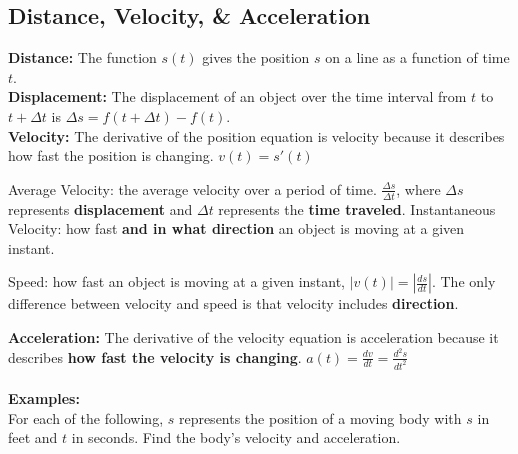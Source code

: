 \subsection*{Distance, Velocity, \& Acceleration}
\noindent\textbf{Distance:} The function $s(t)$ gives the position $s$ on a line as a function of time $t$.\\
\noindent\textbf{Displacement:} The displacement of an object over the time interval from $t$ to $t+\Delta t$ is $\Delta s=f(t+\Delta t)-f(t)$.\\
\noindent\textbf{Velocity:} The derivative of the position equation is velocity because it describes how fast the position is changing. $v(t)=s'(t)$
\begin{questions}
    \question Average Velocity: the average velocity over a period of time. $\displaystyle\frac{\Delta s}{\Delta t}$, where $\Delta s$ represents \textbf{displacement} and $\Delta t$ represents the \textbf{time traveled}.
    \vspace{.1cm}
    \question Instantaneous Velocity: how fast \textbf{and in what direction} an object is moving at a given instant.
    \question Speed: how fast an object is moving at a given instant, $\displaystyle |v(t)|=\left|\frac{ds}{dt}\right|$. The only difference between velocity and speed is that velocity includes \textbf{direction}.
\end{questions}
\noindent\textbf{Acceleration:} The derivative of the velocity equation is acceleration because it describes \textbf{how fast the velocity is changing}. $\displaystyle a(t)=\frac{dv}{dt}=\frac{d^2 s}{dt^2}$\\
\\
\noindent\textbf{Examples:}\\
For each of the following, $s$ represents the position of a moving body with $s$ in feet and $t$ in seconds. Find the body's velocity and acceleration.
